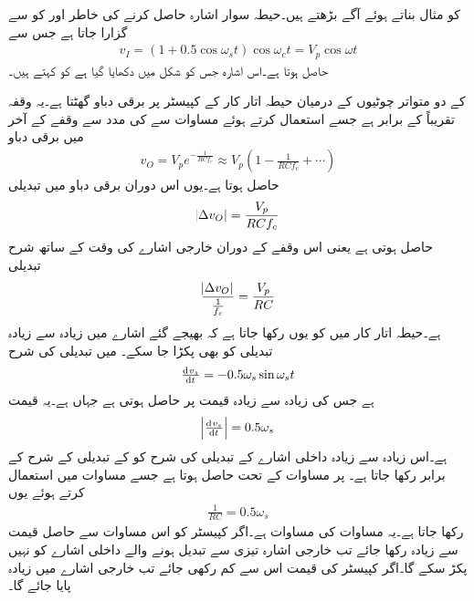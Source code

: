  کو مثال بناتے ہوئے آگے بڑھتے ہیں۔حیطہ سوار اشارہ حاصل کرنے کی خاطر  اور  کو  سے گزارا جاتا ہے جس سے 
\begin{align}\label{مساوات_ڈایوڈ_حیطہ_سوار_اشارہ}
v_I=\left(1+0.5 \cos \omega_s t \right) \cos \omega_c t=V_p \cos \omega t
\end{align}
حاصل ہوتا ہے۔اس اشارہ جس کو شکل  میں دکھایا گیا ہے کو   کہتے ہیں۔

 کے دو متواتر چوٹیوں کے درمیان حیطہ اتار کار کے  کپیسٹر پر برقی دباو گھٹتا ہے۔یہ وقفہ تقریباً  کے برابر ہے جسے استعمال کرتے ہوئے  مساوات  سے  کی مدد سے وقفے کے آخر میں برقی دباو
\begin{align}
v_O=V_{p} e^{-\frac{1}{RC f_c}} \approx V_p \left(1-\frac{1}{RC f_c} +\cdots \right )
\end{align}
حاصل ہوتا ہے۔یوں اس دوران برقی دباو میں تبدیلی
\begin{align*}
\abs{\Delta v_O} =\frac{V_p}{RC f_c}
\end{align*}
حاصل ہوتی ہے یعنی اس وقفے کے دوران خارجی اشارے کی وقت کے ساتھ شرح تبدیلی 
\begin{align}\label{مساوات_ڈایوڈ_حیطہ_اتار_کار_خارجی_اشارہ}
\frac{\abs{\Delta v_O}}{\frac{1}{f_c}} =\frac{V_p}{RC}
\end{align}
ہے۔حیطہ اتار کار میں  کو یوں رکھا جاتا ہے کہ  بھیجے گئے اشارے  میں زیادہ سے زیادہ تبدیلی کو بھی پکڑا جا سکے۔ میں تبدیلی کی شرح
\begin{align*}
\od{v_s}{t}=-0.5 \omega_s \sin \omega_s t
\end{align*}
ہے جس کی زیادہ سے زیادہ قیمت  پر حاصل ہوتی ہے جہاں  ہے۔یہ قیمت 
\begin{align*}
\abs{\od{v_s}{t}}=0.5 \omega_s 
\end{align*} 
ہے۔اس زیادہ سے زیادہ داخلی اشارے کے تبدیلی کی شرح کو  کے تبدیلی کے شرح کے برابر رکھا جاتا ہے۔ پر مساوات  کے تحت  حاصل ہوتا ہے جسے مساوات  میں استعمال کرتے ہوئے یوں
\begin{align}
\frac{1}{RC}=0.5 \omega_s
\end{align}
رکھا جاتا ہے۔یہ مساوات  کی مساوات ہے۔اگر کپیسٹر کو اس مساوات سے حاصل قیمت سے زیادہ رکھا جائے تب خارجی اشارہ تیزی سے تبدیل ہونے والے داخلی اشارے کو نہیں پکڑ سکے گا۔اگر کپیسٹر کی قیمت اس سے کم رکھی جائے تب خارجی اشارے میں  زیادہ پایا جائے گا۔ 

